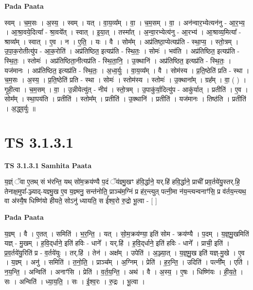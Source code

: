 \documentclass[17pt]{extarticle}
\begin{document}
\textbf{Pada Paata} \newline

स्वम् । च॒म॒सः । अ॒स्य॒ । स्वम् । यत् । वा॒य॒व्य᳚म् । वा॒ । च॒म॒सम् । वा॒ । अन॑न्वार॒भ्येत्यन॑नु - आ॒र॒भ्य॒ । आ॒श्रा॒वये॒दित्या᳚ - श्रा॒वये᳚त् । स्वात् । इ॒या॒त् । तस्मा᳚त् । अ॒न्वा॒रभ्येत्य॑नु - आ॒रभ्य॑ । आ॒श्राव्य॒मित्या᳚ - श्राव्य᳚म् । स्वात् । ए॒व । न । ए॒ति॒ । यः । वै । सोम᳚म् । अप्र॑तिष्ठा॒प्येत्यप्र॑ति - स्था॒प्य॒ । स्तो॒त्रम् । उ॒पा॒क॒रोतीत्यु॑प - आ॒क॒रोति॑ । अप्र॑तिष्ठित॒ इत्यप्र॑ति - स्थि॒तः॒ । सोमः॑ । भव॑ति । अप्र॑तिष्ठित॒ इत्यप्र॑ति - स्थि॒तः॒ । स्तोमः॑ । अप्र॑तिष्ठिता॒नीत्यप्र॑ति - स्थि॒ता॒नि॒ । उ॒क्थानि॑ । अप्र॑तिष्ठित॒ इत्यप्र॑ति - स्थि॒तः॒ । यज॑मानः । अप्र॑तिष्ठित॒ इत्यप्र॑ति - स्थि॒तः॒ । अ॒ध्व॒र्युः । वा॒य॒व्य᳚म् । वै । सोम॑स्य । प्र॒ति॒ष्ठेति॑ प्रति - स्था । च॒म॒सः । अ॒स्य॒ । प्र॒ति॒ष्ठेति॑ प्रति - स्था । सोमः॑ । स्तोम॑स्य । स्तोमः॑ । उ॒क्थाना᳚म् । ग्रह᳚म् । वा॒ ( ) । गृ॒ही॒त्वा । च॒म॒सम् । वा॒ । उ॒न्नीयेत्यु॑त् - नीय॑ । स्तो॒त्रम् । उ॒पाकु॑र्या॒दित्यु॑प - आकु॑र्यात् । प्रतीति॑ । ए॒व । सोम᳚म् । स्था॒पय॑ति । प्रतीति॑ । स्तोम᳚म् । प्रतीति॑ । उ॒क्थानि॑ । प्रतीति॑ । यज॑मानः । तिष्ठ॑ति । प्रतीति॑ । अ॒द्ध्व॒र्युः ॥  \newline





\section{ TS 3.1.3.1 }

\textbf{TS 3.1.3.1 } \newline
\textbf{Samhita Paata} \newline

य॒ज्ञ्ं ॅवा ए॒तथ् सं भ॑रन्ति॒ यथ् सो॑म॒क्रय॑ण्यै प॒दं ॅय॑ज्ञ्मु॒खꣳ ह॑वि॒र्द्धाने॒ यर्.हि॑ हवि॒र्द्धाने॒ प्राची᳚ प्रव॒र्तये॑यु॒स्तर्.हि॒ तेनाक्ष॒मुपा᳚-ञ्ज्याद्-यज्ञ्मु॒ख ए॒व य॒ज्ञ्मनु॒ सन्त॑नोति॒ प्राञ्च॑म॒ग्निं प्र ह॑र॒न्त्युत् पत्नी॒मा न॑य॒न्त्यन्वनाꣳ॑सि॒ प्र व॑र्तय॒न्त्यथ॒ वा अ॑स्यै॒ष धिष्णि॑यो हीयते॒ सोऽनु॑ ध्यायति॒ स ई᳚श्व॒रो रु॒द्रो भू॒त्वा - [  ] \newline

\textbf{Pada Paata} \newline

य॒ज्ञ्म् । वै । ए॒तत् । समिति॑ । भ॒र॒न्ति॒ । यत् । सो॒म॒क्रय॑ण्या॒ इति॑ सोम - क्रय॑ण्यै । प॒दम् । य॒ज्ञ्॒मु॒खमिति॑ यज्ञ् - मु॒खम् । ह॒वि॒द्‌र्धाने॒ इति॑ हविः - धाने᳚ । यर्.हि॑ । ह॒वि॒द्‌र्धाने॒ इति॑ हविः - धाने᳚ । प्राची॒ इति॑ । प्र॒व॒र्तये॑यु॒रिति॑ प्र - व॒र्तये॑युः । तर्.हि॑ । तेन॑ । अक्ष᳚म् । उपेति॑ । अ॒ञ्ज्या॒त् । य॒ज्ञ्॒मु॒ख इति॑ यज्ञ्-मु॒खे । ए॒व । य॒ज्ञ्म् । अनु॑ । समिति॑ । त॒नो॒ति॒ । प्राञ्च᳚म् । अ॒ग्निम् । प्रेति॑ । ह॒र॒न्ति॒ । उदिति॑ । पत्नी᳚म् । एति॑ । न॒य॒न्ति॒ । अन्विति॑ । अनाꣳ॑सि । प्रेति॑ । व॒र्त॒य॒न्ति॒ । अथ॑ । वै । अ॒स्य॒ । ए॒षः । धिष्णि॑यः । ही॒य॒ते॒ । सः । अन्विति॑ । ध्या॒य॒ति॒ । सः । ई॒श्व॒रः । रु॒द्रः । भू॒त्वा ।  \newline
\end{document}
